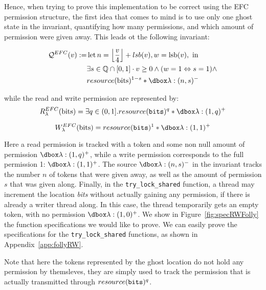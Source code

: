 Hence, when trying to prove this implementation to be correct using the EFC permission structure, the first idea that comes to mind is to use only one ghost state in the invariant, quantifying how many permissions, and which amount of permission were given away. This leads ot the following invariant:

$$\begin{aligned} \mathcal{Q}^{EFC}(v) :=& \operatorname{let} n=\left\lfloor\frac{v}{4}\right\rfloor + lsb(v), w=\operatorname{lsb}(v), \text { in } \\ & \exists s \in \mathbb{Q} \cap[0,1] \cdot v \geq 0 \wedge (w=1 \Leftrightarrow s=1) \wedge \\ & resource(\mathrm{bits})^{1-s} * \ghost{\lambda :(n, s)^{-}}
\end{aligned} $$

while the read and write permission are represented by:
$$\rPerm = \exists q \in (0, 1].\ress{q}* \ghost{\lambda : (1, q)^+}$$

$$\wPerm = \ress{1} * \ghost{\lambda:(1, 1)^+}$$

Here a read permission is tracked with a token and some non null amount of permission $\ghost{\lambda :(1, q)^+}$, while a write permission corresponds to the full permission 1: $\ghost{\lambda:(1, 1)^+}$. The source $\ghost{\lambda :(n, s)^{-}}$ in the invariant tracks the number $n$ of tokens that were given away, as well as the amount of permission $s$ that was given along. Finally, in the \texttt{try\_lock\_shared} function, a thread may increment the location \emph{bits} without actually gaining any permission, if there is already a writer thread along. In this case, the thread temporarily gets an empty token, with no permission $\ghost{\lambda:(1, 0)^+}$.  We show in Figure~\ref{fig:specRWFolly} the function specifications we would like to prove. We can easily prove the specifications for the \texttt{try\_lock\_shared} functions, as shown in Appendix~\ref{app:follyRW}.

Note that here the tokens represented by the ghost location do not hold any permission by themsleves, they are simply used to track the permission that is actually transmitted through $resource(\texttt{bits})^{q}$.

